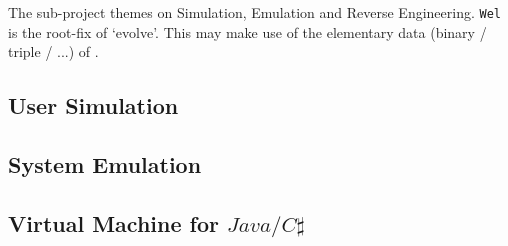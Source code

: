 
The sub-project themes on Simulation, Emulation and Reverse Engineering. \verb`Wel` is the root-fix of `evolve'.
This may make use of the elementary data (binary / triple / ...) of .


\subsection{User Simulation}

\subsection{System Emulation}

\subsection{Virtual Machine for $Java/C\sharp$}
